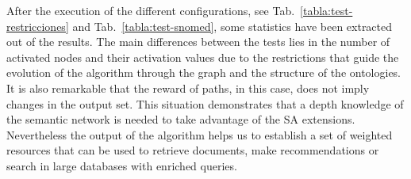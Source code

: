 After the execution of the different configurations, see Tab.~\ref{tabla:test-restricciones} and Tab.~\ref{tabla:test-snomed}, 
some statistics have been extracted out of the results. 
The main differences between the tests lies in the number of activated nodes and their activation values due to the restrictions that guide the evolution
of the algorithm through the graph and the structure of the ontologies. 
It is also remarkable that the reward of paths, in this case, does not imply changes in the output set. This situation demonstrates 
that a depth knowledge of the semantic network is needed to take advantage of the SA extensions. Nevertheless the output of the
algorithm helps us to establish a set of weighted resources that can be used to retrieve documents, make recommendations or search in 
large databases with enriched queries.


